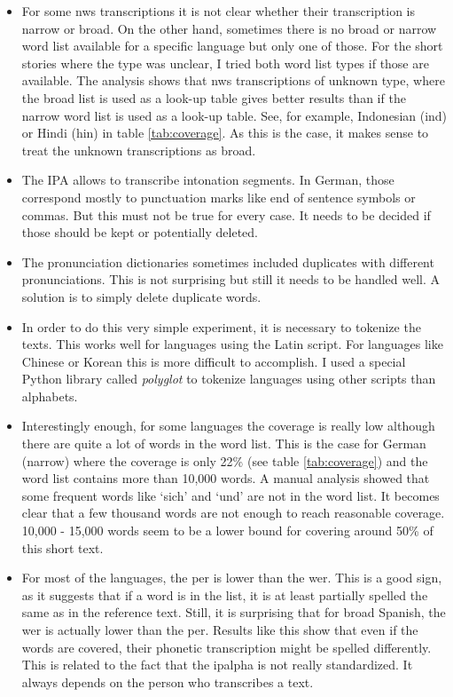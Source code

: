 \begin{itemize}
\item For some \ac{nws} transcriptions it is not clear whether their transcription is narrow or broad. On the other hand, sometimes there is no broad or narrow word list available for a specific language but only one of those. For the short stories where the type was unclear, I tried both word list types if those are available. The analysis shows that \ac{nws} transcriptions of unknown type, where the broad list is used as a look-up table gives better results than if the narrow word list is used as a look-up table. See, for example, Indonesian (ind) or Hindi (hin) in table \ref{tab:coverage}. As this is the case, it makes sense to treat the unknown transcriptions as broad. 
\item The IPA allows to transcribe intonation segments. In German, those correspond mostly to punctuation marks like end of sentence symbols or commas. But this must not be true for every case. It needs to be decided if those should be kept or potentially deleted.
\item The pronunciation dictionaries sometimes included duplicates with different pronunciations. This is not surprising but still it needs to be handled well. A solution is to simply delete duplicate words.
\item In order to do this very simple experiment, it is necessary to tokenize the texts. This works well for languages using the Latin script. For languages like Chinese or Korean this is more difficult to accomplish. I used a special Python library called \textit{polyglot} to tokenize languages using other scripts than alphabets.
\item Interestingly enough, for some languages the coverage is really low although there are quite a lot of words in the word list. This is the case for German (narrow) where the coverage is only 22\% (see table \ref{tab:coverage}) and the word list contains more than 10,000 words. A manual analysis showed that some frequent words like `sich' and `und' are not in the word list. It becomes clear that a few thousand words are not enough to reach reasonable coverage. 10,000 - 15,000 words seem to be a lower bound for covering around 50\% of this short text.
\item For most of the languages, the \ac{per} is lower than the \ac{wer}. This is a good sign, as it suggests that if a word is in the list, it is at least partially spelled the same as in the reference text. Still, it is surprising that for broad Spanish, the \ac{wer} is actually lower than the \ac{per}. Results like this show that even if the words are covered, their phonetic transcription might be spelled differently. This is related to the fact that the \ac{ipalpha} is not really standardized. It always depends on the person who transcribes a text.
\end{itemize}

